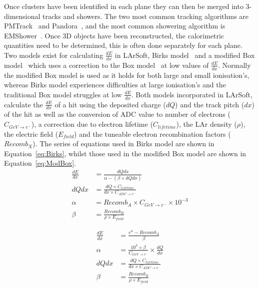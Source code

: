 Once clusters have been identified in each plane they can then be merged into 3-dimensional tracks and showers. The two most common tracking algorithms are PMTrack~\citep{PMTrack} and Pandora~\citep{Pandora}, and the most common showering algorithm is EMShower~\citep{EMShower}. Once 3D objects have been reconstructed, the calorimetric quantities need to be determined, this is often done separately for each plane. Two models exist for calculating $\frac{dE}{dx}$ in LArSoft, Birks model~\citep{BirksModel} and a modified Box model~\citep{PIDA_Paper} which uses a correction to the Box model~\citep{BoxModel} at low values of $\frac{dE}{dx}$. Normally the modified Box model is used as it holds for both large and small ionisation's, whereas Birks model experiences difficulties at large ionisation's and the traditional Box model struggles at low $\frac{dE}{dx}$. Both models incorporated in LArSoft, calculate the $\frac{dE}{dx}$ of a hit using the deposited charge ($dQ$) and the track pitch ($dx$) of the hit as well as the conversion of ADC value to number of electrons ($C_{GeV \rightarrow e^{-}}$), a correction due to electron lifetime ($C_{lifetime}$), the LAr density ($\rho$), the electric field ($E_{field}$) and the tuneable electron recombination factors ($Recomb_{X}$). The series of equations used in Birks model are shown in Equation~\ref{eq:Birks}, whilst those used in the modified Box model are shown in Equation~\ref{eq:ModBox}. \\

\begin{subequations}
  \label{eq:Birks}
  \begin{align}
    \frac{dE}{dx} &= \frac{ dQdx }{ \alpha - (\beta \times dQdx) } \label{eq:Birks_1} \\
    dQdx &= \frac{ dQ \times C_{lifetime} }{ dx \times C_{ADC \rightarrow e^{-}} } \label{eq:Birks_Correc} \\
    \alpha &= Recomb_{A} \times C_{GeV \rightarrow e^{-}} \times 10^{-3} \label{eq:Birks_A}\\
    \beta  &= \frac{ Recomb_{B} }{ \rho \times E_{field} } \label{eq:Birks_B}
  \end{align}
\end{subequations}

\begin{subequations}
  \label{eq:ModBox}
  \begin{align}
    \frac{dE}{dx} &= \frac{ e^{\alpha} - Recomb_{A} }{ \beta } \label{eq:ModBox_1} \\
    \alpha &= \frac{10^3 \times \beta }{ C_{GeV \rightarrow e^{-} } } \times \frac{dQ}{dx} \label{eq:ModBox_A}\\
    dQdx &= \frac{ dQ \times C_{lifetime} }{ dx \times C_{ADC \rightarrow e^{-}} } \label{eq:ModBox_Correc} \\
    \beta &= \frac{ Recomb_{B} }{ \rho \times E_{field} } \label{eq:ModBox_B}
  \end{align}
\end{subequations}


